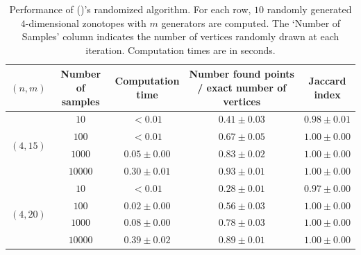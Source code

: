 \begin{table}[!ht]
    \centering
    \begin{tabular}{|c|c|c|c|c|}
    \hline
    $(n,m)$ & \makecell{Number of \\ samples} & \makecell{Computation \\ time} & \makecell{Number found points \\ / exact number of vertices} & \makecell{Jaccard \\ index} \\
    \hline
    \hline

    \multirow{ 4}{*}{$(4,15)$} & $10$ & $<0.01$ & $0.41\pm 0.03$ & $0.98\pm 0.01$  \\
    \cline{2-5}
     & $100$ & $<0.01$ & $0.67\pm 0.05$ & $\mathbf{1.00\pm 0.00}$  \\
     \cline{2-5}
     & $1000$ & $0.05\pm 0.00$ & $0.83\pm 0.02$ & $\mathbf{1.00\pm 0.00}$ \\
    \cline{2-5}
     & $10000$ & $0.30\pm 0.01$ & $0.93\pm 0.01$ & $\mathbf{1.00\pm 0.00}$ \\
    \hline
    \multirow{ 4}{*}{$(4,20)$} & $10$ & $<0.01$ & $0.28\pm 0.01$ & $0.97\pm 0.00$ \\
    \cline{2-5}
     & $100$ & $0.02\pm 0.00$ & $0.56\pm 0.03$ & $\mathbf{1.00\pm 0.00}$ \\
    \cline{2-5}
     & $1000$ & $0.08\pm 0.00$ & $0.78\pm 0.03$ & $\mathbf{1.00\pm 0.00}$ \\
    \cline{2-5}
     & $10000$ & $0.39\pm 0.02$ & $0.89\pm 0.01$ & $\mathbf{1.00\pm 0.00}$ \\
    \hline
    \end{tabular}
    \caption{Performance of (\cite{stinsonRandomizedAlgorithmEnumerating2016})'s randomized algorithm. For each row, $10$ randomly generated $4$-dimensional zonotopes with $m$ generators are computed. The `Number of Samples' column indicates the number of vertices randomly drawn at each iteration. Computation times are in seconds.}
    \label{tab:approx_vertex_set_stinson}
\end{table}

